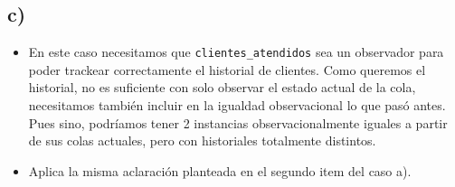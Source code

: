 \subsection*{c)}

\begin{itemize}
    \item En este caso necesitamos que \lstinline{clientes_atendidos} sea un observador para poder trackear correctamente el historial de clientes. Como queremos el historial, no es suficiente con solo observar el estado actual de la cola, necesitamos también incluir en la igualdad observacional lo que pasó antes. Pues sino, podríamos tener 2 instancias observacionalmente iguales a partir de sus colas actuales, pero con historiales totalmente distintos.
    \item Aplica la misma aclaración planteada en el segundo item del caso a).
\end{itemize}
